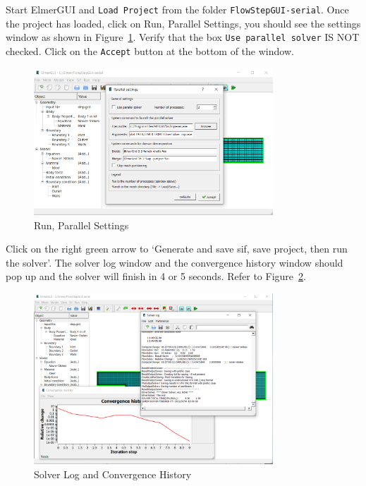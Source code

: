 \newpage

Start ElmerGUI and \texttt{Load Project} from the folder \texttt{FlowStepGUI-serial}.  Once the project has loaded, click on Run, Parallel Settings, you should see the settings window as shown in Figure~\ref{fg:settings}.  Verify that the box \texttt{Use parallel solver} IS NOT checked.  Click on the \texttt{Accept} button at the bottom of the window.

\begin{figure}[H]
\centering
\includegraphics[width=0.8\textwidth]{serial-13}
\caption{Run, Parallel Settings}\label{fg:settings}
\end{figure}

Click on the right green arrow to `Generate and save sif, save project,  then run the solver'.  The solver log window and the convergence history window should pop up and the solver will finish in 4 or 5 seconds.  Refer to Figure~\ref{fg:solver}.

\begin{figure}[H]
\centering
\includegraphics[width=0.8\textwidth]{serial-14}
\caption{Solver Log and Convergence History}\label{fg:solver}
\end{figure}

